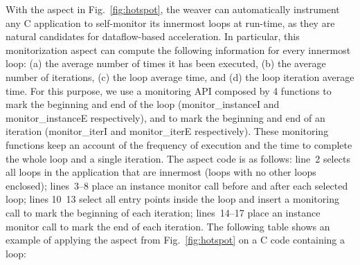 \noindent With the aspect in Fig.~\ref{fig:hotspot}, the weaver can automatically instrument any C application to self-monitor its innermost loops at run-time, as they are natural candidates for dataflow-based acceleration. In particular, this monitorization aspect can compute the following information for every innermost loop: (a) the average number of times it has been executed, (b) the average number of iterations, (c) the loop average time, and (d) the loop iteration average time. For this purpose, we use a monitoring API composed by 4 functions to mark the beginning and end of the loop (monitor\_instanceI and monitor\_instanceE respectively), and to mark the beginning and end of an iteration (monitor\_iterI and monitor\_iterE respectively). These monitoring functions keep an account of the frequency of execution and the time to complete the whole loop and a single iteration.  The aspect code is as follows: line~2 selects all loops in the application that are innermost (loops with no other loops enclosed); lines~3--8 place an instance monitor call before and after each selected loop; lines 10~13 select all entry points inside the loop and insert a monitoring call to mark the beginning of each iteration; lines~14--17 place an instance monitor call to mark the end of each iteration. The following table shows an example of applying the aspect from Fig.~\ref{fig:hotspot} on a C code containing a loop:

